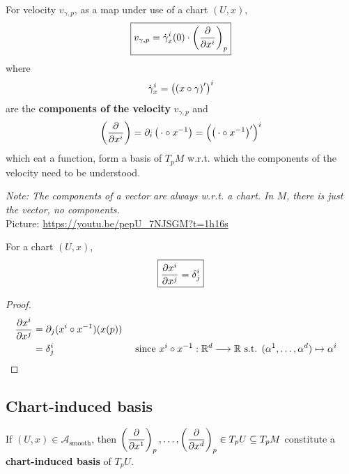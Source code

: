 \begin{definition}
For velocity $v_{\gamma,p}$, as a map under use of a chart $(U,x)$,
\begin{equation}\label{eq:defVelocityExpansion}
\boxed{v_{\gamma,p} = \dot{\gamma}_x^i(0) \cdot \left(\cibasis{x^i}\right)_p}
\end{equation} 
where
\begin{equation}\label{eq:defVelocityComponents}
\displaystyle\dot{\gamma}_x^i = \left(\left(x \after \gamma\right)^\prime\right)^i
\end{equation} 
are the \textbf{components of the velocity} $v_{\gamma,p}$ and
\begin{equation}\label{eq:defCIBasis}
\displaystyle\left(\cibasis{x^i}\right) = \partial_i\left(\,\cdot \after x^{-1}\right) = \left(\left(\, \cdot \after x^{-1}\right)^\prime\right)^i
\end{equation} 
which eat a function, form a basis of $T_pM$ w.r.t. which the components of the velocity need to be understood.
\end{definition}

\textit{Note: The components of a vector are always w.r.t. a chart. In $M$, there is just the vector, no components.} \\
Picture: \url{https://youtu.be/pepU_7NJSGM?t=1h16s}

\begin{theorem}
\label{thm:L5_dxiupondxj}
For a chart $(U,x)$,
\begin{equation}
\boxed{\cibasis[x^i]{x^j} = \delta^i_j}
\end{equation}
\end{theorem}
\begin{proof}
\begin{align*}
\cibasis[x^i]{x^j} & = \partial_j (x^i \after x^{-1})(x(p)) \\
& = \delta^i_j && \text{ since } x^i \after x^{-1} : \mathbb{R}^d \to \mathbb{R} \text{ s.t. } (\alpha^1 , \dots , \alpha^d) \mapsto \alpha^i
\end{align*}
\end{proof}

\subsection{Chart-induced basis}
\begin{definition}
If $(U,x) \in \mathcal{A}_{\text{smooth}}$, then $\displaystyle\left(\cibasis{x^1}\right)_p, \dotsc, \left(\cibasis{x^d}\right)_p \in T_pU \subseteq T_pM$ constitute a \textbf{chart-induced basis} of $T_pU$.
\end{definition}

